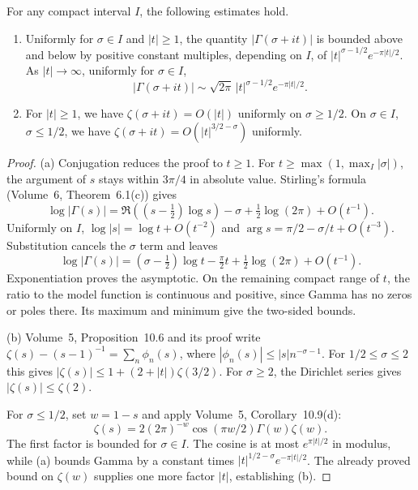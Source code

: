 \begin{lemma}\label{lem:verticalsizes}
For any compact interval $I$, the following estimates hold.
\begin{enumerate}
\item[(a)] Uniformly for $\sigma\in I$ and $|t|\ge1$, the quantity $|\Gamma(\sigma+it)|$ is bounded above and below by positive constant multiples, depending on $I$, of $|t|^{\sigma-1/2}e^{-\pi|t|/2}$. As $|t|\to\infty$, uniformly for $\sigma\in I$,
\[|\Gamma(\sigma+it)|\sim\sqrt{2\pi}\,|t|^{\sigma-1/2}e^{-\pi|t|/2}.\]
\item[(b)] For $|t|\ge1$, we have $\zeta(\sigma+it)=O(|t|)$ uniformly on $\sigma\ge1/2$. On $\sigma\in I$, $\sigma\le1/2$, we have $\zeta(\sigma+it)=O(|t|^{3/2-\sigma})$ uniformly.
\end{enumerate}
\end{lemma}
\begin{proof}
(a) Conjugation reduces the proof to $t\ge1$. For $t\ge\max(1,\max_I|\sigma|)$, the argument of $s$ stays within $3\pi/4$ in absolute value. Stirling's formula (Volume~6, Theorem~6.1(c)) gives
\[\log|\Gamma(s)|=\Re((s-\tfrac12)\log s)-\sigma+\tfrac12\log(2\pi)+O(t^{-1}).\]
Uniformly on $I$, $\log|s|=\log t+O(t^{-2})$ and $\arg s=\pi/2-\sigma/t+O(t^{-3})$. Substitution cancels the $\sigma$ term and leaves
\[\log|\Gamma(s)|=(\sigma-\tfrac12)\log t-\tfrac\pi2t+\tfrac12\log(2\pi)+O(t^{-1}).\]
Exponentiation proves the asymptotic. On the remaining compact range of $t$, the ratio to the model function is continuous and positive, since Gamma has no zeros or poles there. Its maximum and minimum give the two-sided bounds.

(b) Volume~5, Proposition~10.6 and its proof write $\zeta(s)-(s-1)^{-1}=\sum_n\phi_n(s)$, where $|\phi_n(s)|\le|s|n^{-\sigma-1}$. For $1/2\le\sigma\le2$ this gives $|\zeta(s)|\le1+(2+|t|)\zeta(3/2)$. For $\sigma\ge2$, the Dirichlet series gives $|\zeta(s)|\le\zeta(2)$.

For $\sigma\le1/2$, set $w=1-s$ and apply Volume~5, Corollary~10.9(d):
\[\zeta(s)=2(2\pi)^{-w}\cos(\pi w/2)\Gamma(w)\zeta(w).\]
The first factor is bounded for $\sigma\in I$. The cosine is at most $e^{\pi|t|/2}$ in modulus, while (a) bounds Gamma by a constant times $|t|^{1/2-\sigma}e^{-\pi|t|/2}$. The already proved bound on $\zeta(w)$ supplies one more factor $|t|$, establishing (b).
\end{proof}

